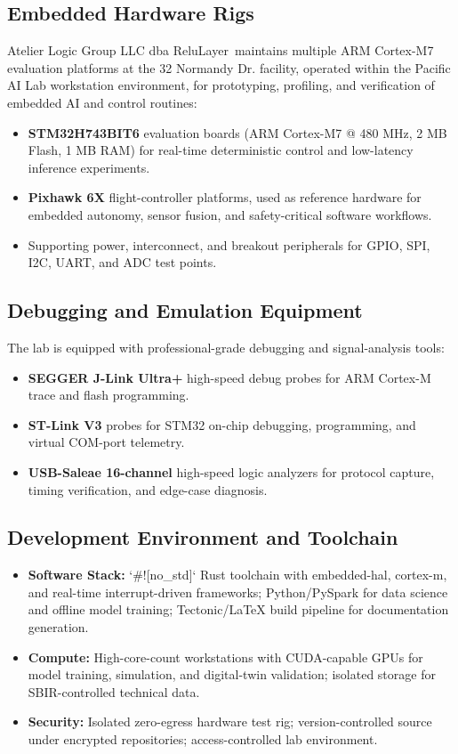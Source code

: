 \documentclass[11pt]{article}
\begin{document}
\subsection{Embedded Hardware Rigs}

Atelier Logic Group LLC dba ReluLayer\texttrademark\ maintains multiple ARM Cortex-M7 evaluation platforms at the 32 Normandy Dr. facility, operated within the Pacific AI Lab workstation environment, for prototyping, profiling, and verification of embedded AI and control routines:

\begin{itemize}
\item \textbf{STM32H743BIT6} evaluation boards (ARM Cortex-M7 @ 480 MHz, 2 MB Flash, 1 MB RAM) for real-time deterministic control and low-latency inference experiments.
\item \textbf{Pixhawk 6X} flight-controller platforms, used as reference hardware for embedded autonomy, sensor fusion, and safety-critical software workflows.
\item Supporting power, interconnect, and breakout peripherals for GPIO, SPI, I2C, UART, and ADC test points.
\end{itemize}

\subsection{Debugging and Emulation Equipment}

The lab is equipped with professional-grade debugging and signal-analysis tools:

\begin{itemize}
\item \textbf{SEGGER J-Link Ultra+} high-speed debug probes for ARM Cortex-M trace and flash programming.
\item \textbf{ST-Link V3} probes for STM32 on-chip debugging, programming, and virtual COM-port telemetry.
\item \textbf{USB-Saleae 16-channel} high-speed logic analyzers for protocol capture, timing verification, and edge-case diagnosis.
\end{itemize}

\subsection{Development Environment and Toolchain}

\begin{itemize}
\item \textbf{Software Stack:} `\#![no\_std]` Rust toolchain with embedded-hal, cortex-m, and real-time interrupt-driven frameworks; Python/PySpark for data science and offline model training; Tectonic/LaTeX build pipeline for documentation generation.
\item \textbf{Compute:} High-core-count workstations with CUDA-capable GPUs for model training, simulation, and digital-twin validation; isolated storage for SBIR-controlled technical data.
\item \textbf{Security:} Isolated zero-egress hardware test rig; version-controlled source under encrypted repositories; access-controlled lab environment.
\end{itemize}
\end{document}
